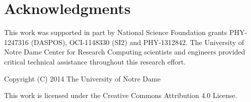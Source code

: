 \documentclass[procedia]{easychair}
\begin{document}
\section*{Acknowledgments}

This work was supported in part by National Science Foundation grants PHY-1247316 (DASPOS), 
OCI-1148330 (SI2) and PHY-1312842.
The University of Notre Dame Center for Research Computing scientists and engineers provided critical technical assistance throughout this research effort.

Copyright (C) 2014 The University of Notre Dame

This work is licensed under the Creative Commons Attribution 4.0 License.



\end{document}
